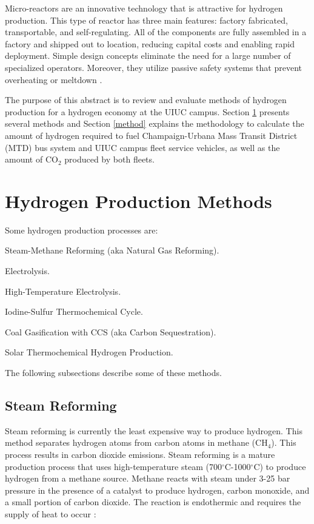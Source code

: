 \documentclass{anstrans}
\begin{document}
Micro-reactors are an innovative technology that is attractive for hydrogen production. This type of reactor has three main features: factory fabricated, transportable, and self-regulating. All of the components are fully assembled in a factory and shipped out to location, reducing capital costs and enabling rapid deployment. Simple design concepts eliminate the need for a large number of specialized operators. Moreover, they utilize passive safety systems that prevent overheating or meltdown \cite{noauthor_ultimate_2019}.

The purpose of this abstract is to review and evaluate methods of hydrogen production for a hydrogen economy at the UIUC campus.
Section \ref{section:hydroprod} presents several methods and Section \ref{method} explains the methodology to calculate the amount of hydrogen required to fuel Champaign-Urbana Mass Transit District (MTD) bus system and UIUC campus fleet service vehicles, as well as the amount of CO$_2$ produced by both fleets.

\section{Hydrogen Production Methods}
\label{section:hydroprod}

Some hydrogen production processes are: 
\begin{description}[font=$\bullet$\scshape\bfseries]
	\item[] Steam-Methane Reforming (aka Natural Gas Reforming).
	\item[] Electrolysis.
	\item[] High-Temperature Electrolysis.
	\item[] Iodine-Sulfur Thermochemical Cycle.
	\item[] Coal Gasification with CCS (aka Carbon Sequestration).
	\item[] Solar Thermochemical Hydrogen Production.
\end{description}

The following subsections describe some of these methods.

\subsection{Steam Reforming}

Steam reforming is currently the least expensive way to produce hydrogen. This method separates hydrogen atoms from carbon atoms in methane (CH$_4$). This process results in carbon dioxide emissions.
Steam reforming is a mature production process that uses high-temperature steam (700$^{\circ}$C-1000$^{\circ}$C) to produce hydrogen from a methane source. Methane reacts with steam under 3-25 bar pressure in the presence of a catalyst to produce hydrogen, carbon monoxide, and a small portion of carbon dioxide. The reaction is endothermic and requires the supply of heat to occur \cite{noauthor_hydrogen_nodate}:
\end{document}
